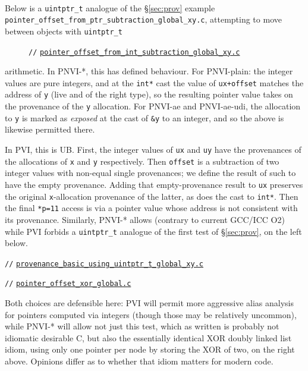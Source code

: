\documentclass[acmsmall,review,screen]{acmart}\settopmatter{printfolios=true,printccs=false,printacmref=false}
\newcommand{\myparagraph}[1]{\vspace{0.5\baselineskip}\par\noindent{\normalsize\bfseries{#1}}\quad}
\newcommand{\mytesturl}[1]{https://cerberus.cl.cam.ac.uk/cerberus?defacto/#1}
\newcommand{\mytestlink}[2]{\href{\mytesturl{#1}}{#2}}
\newcommand{\mylsttestlink}[1]{\mytestlink{#1}{\lstinline{#1}}}
\newcommand{\mylistingmargin}{5mm}
\newcommand{\myfooexample}[3]{{\vspace*{-0.5\baselineskip}\par{\noindent\small\hspace*{\mylistingmargin}\lstinline{//} \mylsttestlink{#2}\vspace*{0.25\baselineskip}\par}}}
\begin{document}
\ 

 
\myparagraph{Inter-object integer arithmetic}
Below is a \lstinline{uintptr_t} analogue of the \S\ref{sec:prov} example
\texttt{pointer\_offset\_from\_ptr\_subtraction\_global\_xy.c}, attempting to move between objects
with \lstinline{uintptr_t}
\begin{figure}
{\renewcommand{\mylistingmargin}{0mm}\myfooexample{charon_tests}{pointer_offset_from_int_subtraction_global_xy.c}{}%
}
\vspace*{-2\baselineskip}
\end{figure}
arithmetic.
%
In PNVI-*, this has defined behaviour.  For PNVI-plain: the integer
values are pure integers, and at the \lstinline{int*} cast
the value of \lstinline{ux+offset} matches the address
of \lstinline{y} (live and of the right type), so the
resulting pointer value takes on the provenance of the \lstinline{y}
allocation.  For PNVI-ae and PNVI-ae-udi, the allocation to \lstinline{y}
is marked as \emph{exposed} at the cast of \lstinline{&y} to an
integer, and so the above is likewise permitted there. 

In PVI, this is UB. First,
the integer values of \lstinline{ux}
and \lstinline{uy} have the provenances of the allocations
of \lstinline{x} and \lstinline{y} respectively. Then 
\lstinline{offset} is a subtraction of two integer values with
non-equal single provenances; we define the result of such to have the
empty provenance.  Adding that empty-provenance result
to \lstinline{ux} preserves the original \lstinline{x}-allocation
provenance of the latter, as does 
the cast to \lstinline{int*}.
Then the final \lstinline{*p=11} access is via a pointer value whose
address is not consistent with its provenance.
%
%
Similarly, PNVI-* allows
(contrary to current GCC/ICC O2) while PVI
forbids a \lstinline{uintptr_t} analogue of the
first test of \S\ref{sec:prov}, on the left below.



\begin{center}
  \begin{minipage}[t]{0.49\textwidth}
{\renewcommand{\mylistingmargin}{0mm}\myfooexample{charon_tests}{provenance_basic_using_uintptr_t_global_xy.c}{}%
}
\vspace*{-0\baselineskip}
\end{minipage}
  \begin{minipage}[t]{0.49\textwidth}
    {\renewcommand{\mylistingmargin}{0mm}\myfooexample{charon_tests}{pointer_offset_xor_global.c}{}%
}
  \end{minipage}
  \end{center}
Both choices are defensible here: PVI will permit more aggressive
alias analysis for pointers computed via integers (though those may be
relatively uncommon), while PNVI-* will
allow not just this test, which as written is probably not idiomatic
desirable C, but also the essentially identical XOR doubly linked list
idiom, using only one pointer per
node by storing the XOR of two, on the right above.  Opinions differ as to
whether that idiom matters for modern code. 
\end{document}
